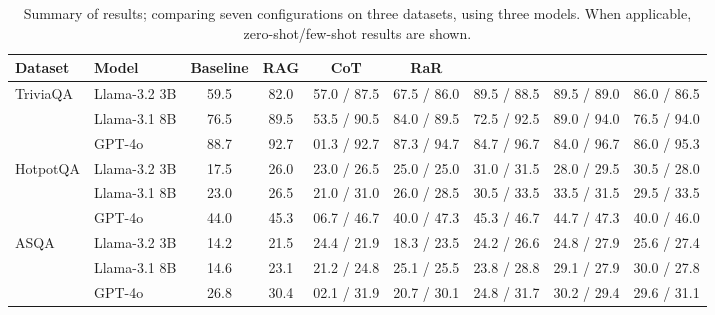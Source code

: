 
\begin{table*}[t]
    \centering
    \small
    \begin{tabular}{llccccccc}
      \toprule
      Dataset & Model & Baseline & RAG & CoT & RaR & \rephrase-3 & \rephrase-5 & \rephrase-10 \\
      \midrule
      \multirow[l]{3}{*}{TriviaQA}
              & Llama-3.2 3B  & 59.5 & 82.0 & 57.0 / 87.5  & 67.5 / 86.0 &  89.5 / 88.5 & 89.5 / 89.0  &  86.0 / 86.5 \\
              & Llama-3.1 8B  & 76.5 & 89.5 & 53.5 / 90.5  & 84.0 / 89.5 &  72.5 / 92.5 & 89.0 / 94.0  &  76.5 / 94.0 \\
              & GPT-4o    & 88.7 & 92.7 & 01.3 / 92.7  & 87.3 / 94.7 &  84.7 / 96.7 & 84.0 / 96.7   &  86.0 / 95.3 \\
      \midrule
      \multirow[l]{3}{*}{HotpotQA}
              & Llama-3.2 3B  &  17.5  & 26.0  & 23.0 / 26.5  & 25.0 / 25.0  &  31.0 / 31.5  & 28.0 / 29.5  &  30.5 / 28.0   \\
              & Llama-3.1 8B  &  23.0  & 26.5  & 21.0 / 31.0  & 26.0 / 28.5  &  30.5 / 33.5  & 33.5 / 31.5  &  29.5 / 33.5   \\
              & GPT-4o    &  44.0  & 45.3  & 06.7 / 46.7  & 40.0 / 47.3  &  45.3 / 46.7  & 44.7 / 47.3  &  40.0 / 46.0   \\
      \midrule
      \multirow[l]{3}{*}{ASQA}
              & Llama-3.2 3B  &  14.2 & 21.5  & 24.4 / 21.9  & 18.3 / 23.5  &  24.2 / 26.6   & 24.8 / 27.9  &  25.6 / 27.4  \\ 
              & Llama-3.1 8B  &  14.6 & 23.1  & 21.2 / 24.8  & 25.1 / 25.5  &  23.8 / 28.8   & 29.1 / 27.9  &  30.0 / 27.8    \\ 
              & GPT-4o    &  26.8 & 30.4  & 02.1 / 31.9  & 20.7 / 30.1  &  24.8 / 31.7    &  30.2 / 29.4 &  29.6 / 31.1   \\ 
      \bottomrule
    \end{tabular}
    \caption{Summary of results; comparing seven configurations on three datasets, using three models. When applicable, zero-shot/few-shot results are shown.}
    \label{tab:more_results}
\end{table*}
